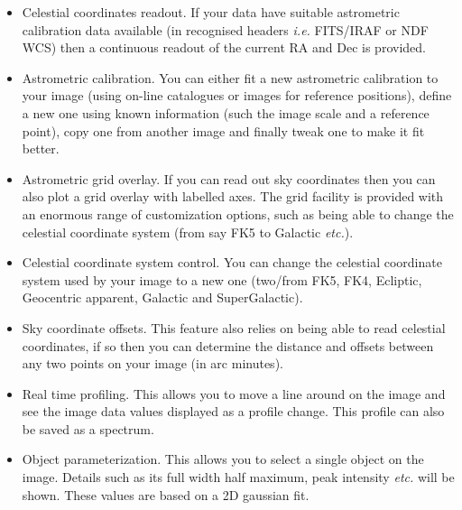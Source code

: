 \documentclass[twoside,11pt]{article}
\renewcommand{\_}{\texttt{\symbol{95}}}
\begin{document}
\begin{itemize}
\item Celestial coordinates readout. If your data have suitable
  astrometric calibration data available (in recognised headers
  {\em i.e.} FITS/IRAF or NDF WCS) then a continuous readout of the
  current RA and Dec is provided.

\item Astrometric calibration. You can either fit a new
  astrometric calibration to your image (using on-line catalogues or
  images for reference positions), define a new one using known
  information (such the image scale and a reference point), copy one
  from another image and finally tweak one to make it fit better.

\item Astrometric grid overlay. If you can read out sky coordinates
  then you can also plot a grid overlay with labelled
  axes. The grid facility is provided with an enormous range of
  customization options, such as being able to change the
  celestial coordinate system (from say FK5 to  Galactic {\em etc.}).

\item Celestial coordinate system control. You can change the celestial
  coordinate system used by your image to a new one (two/from FK5,
  FK4, Ecliptic, Geocentric apparent, Galactic and SuperGalactic).

\item Sky coordinate offsets. This feature also relies on being
  able to read celestial coordinates, if so then you can
  determine the distance and offsets between any two points on
  your image (in arc minutes).

\item Real time profiling. This allows you to move a line around on
  the image and see the image data values displayed as a
  profile change. This profile can also be saved as a spectrum.

\item Object parameterization. This allows you to select a single
  object on the image. Details such as its full width half
  maximum, peak intensity {\em etc.} will be shown. These values are
  based on a 2D gaussian fit.
\end{itemize}
\end{document}
